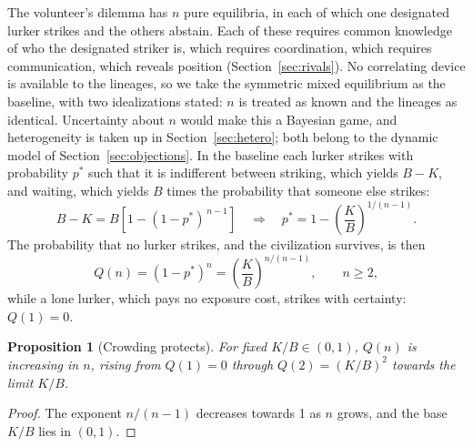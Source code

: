 \documentclass[preprint,12pt]{elsarticle}
\newtheorem{proposition}{Proposition}
\theoremstyle{definition}
\begin{document}
The volunteer's dilemma has $n$ pure equilibria, in each of which one designated lurker strikes and the others abstain. Each of these requires common knowledge of who the designated striker is, which requires coordination, which requires communication, which reveals position (Section~\ref{sec:rivals}). No correlating device is available to the lineages, so we take the symmetric mixed equilibrium as the baseline, with two idealizations stated: $n$ is treated as known and the lineages as identical. Uncertainty about $n$ would make this a Bayesian game, and heterogeneity is taken up in Section~\ref{sec:hetero}; both belong to the dynamic model of Section~\ref{sec:objections}. In the baseline each lurker strikes with probability $p^{*}$ such that it is indifferent between striking, which yields $B - K$, and waiting, which yields $B$ times the probability that someone else strikes:
\begin{equation}
B - K = B\left[1 - (1 - p^{*})^{\,n-1}\right]
\quad\Longrightarrow\quad
p^{*} = 1 - \left(\frac{K}{B}\right)^{1/(n-1)} .
\end{equation}
The probability that no lurker strikes, and the civilization survives, is then
\begin{equation}
Q(n) = (1 - p^{*})^{n} = \left(\frac{K}{B}\right)^{n/(n-1)}, \qquad n \geq 2,
\label{eq:Q}
\end{equation}
while a lone lurker, which pays no exposure cost, strikes with certainty: $Q(1) = 0$.

\begin{proposition}[Crowding protects]
\label{prop:crowding}
For fixed $K/B \in (0,1)$, $Q(n)$ is increasing in $n$, rising from $Q(1) = 0$ through $Q(2) = (K/B)^{2}$ towards the limit $K/B$.
\end{proposition}

\begin{proof}
The exponent $n/(n-1)$ decreases towards 1 as $n$ grows, and the base $K/B$ lies in $(0,1)$.
\end{proof}
\end{document}
